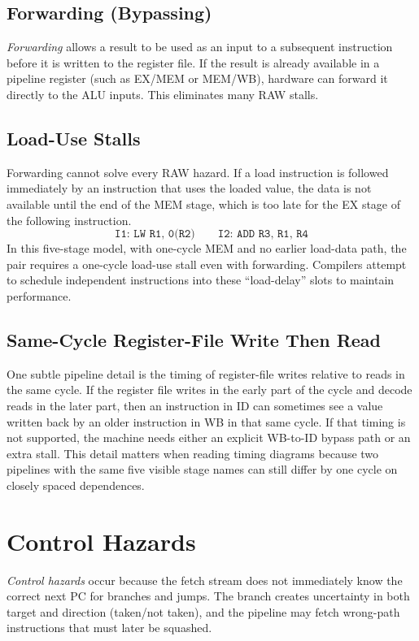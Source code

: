 \subsection{Forwarding (Bypassing)}\label{subsec:auto-005}
\textit{Forwarding} allows a result to be used as an input to a subsequent instruction before it is written to the register file.
If the result is already available in a pipeline register (such as EX/MEM or MEM/WB), hardware can forward it directly to the ALU inputs.
This eliminates many RAW stalls.

\subsection{Load-Use Stalls}\label{subsec:auto-006}
Forwarding cannot solve every RAW hazard.
If a load instruction is followed immediately by an instruction that uses the loaded value, the data is not available until the end of the MEM stage, which is too late for the EX stage of the following instruction.
\begin{equation}\label{eq:auto-043}
    \texttt{I1: LW R1, 0(R2)} \qquad \texttt{I2: ADD R3, R1, R4}
\end{equation}
In this five-stage model, with one-cycle MEM and no earlier load-data path, the pair requires a one-cycle load-use stall even with forwarding.
Compilers attempt to schedule independent instructions into these ``load-delay'' slots to maintain performance.

\subsection{Same-Cycle Register-File Write Then Read}\label{subsec:auto-006a}
One subtle pipeline detail is the timing of register-file writes relative to reads in the same cycle.
If the register file writes in the early part of the cycle and decode reads in the later part, then an instruction in ID can sometimes see a value written back by an older instruction in WB in that same cycle.
If that timing is not supported, the machine needs either an explicit WB-to-ID bypass path or an extra stall.
This detail matters when reading timing diagrams because two pipelines with the same five visible stage names can still differ by one cycle on closely spaced dependences.


\section{Control Hazards}\label{sec:auto-041}
\textit{Control hazards} occur because the fetch stream does not immediately know the correct next PC for branches and jumps.
The branch creates uncertainty in both target and direction (taken/not taken), and the pipeline may fetch wrong-path instructions that must later be squashed.


